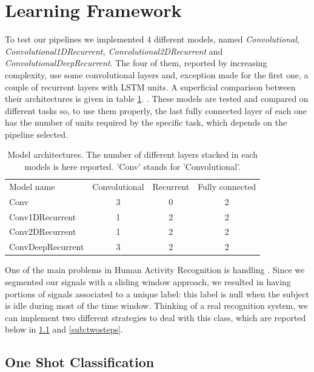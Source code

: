 \section{Learning Framework}
\label{sec:learning_framework}

To test our pipelines we implemented 4 different models, named \textit{Convolutional, Convolutional1DRecurrent, Convolutional2DRecurrent} and \textit{ConvolutionalDeepRecurrent}. The four of them, reported by increasing complexity, use some convolutional layers and, exception made for the first one, a couple of recurrent layers with LSTM units. A superficial comparison between their architectures is given in table \ref{tab:models}. .
These models are tested and compared on different tasks so, to use them properly, the last fully connected layer of each one has the number of units required by the specific task, which depends on the pipeline selected.

\begin{table}[]
	\begin{tabular}{lccc}
		Model name        & Convolutional & Recurrent & Fully connected \\
		Conv              & 3             & 0         & 2			   \\
		Conv1DRecurrent   & 1             & 2         & 2               \\
		Conv2DRecurrent   & 1             & 2         & 2               \\
		ConvDeepRecurrent & 3             & 2         & 2
	\end{tabular}
	\caption{Model architectures. The number of different layers stacked in each models is here reported. 'Conv' stands for 'Convolutional'.}
	\label{tab:models}
\end{table}



One of the main problems in Human Activity Recognition is handling . Since we segmented our signals with a sliding window approach, we resulted in having portions of signals associated to a unique label: this label is null when the subject is idle during most of the time window. Thinking of a real recognition system, we can implement two different strategies to deal with this class, which are reported below in \ref{sub:oneshot} and \ref{sub:twosteps}.

\subsection{One Shot Classification}
\label{sub:oneshot}

